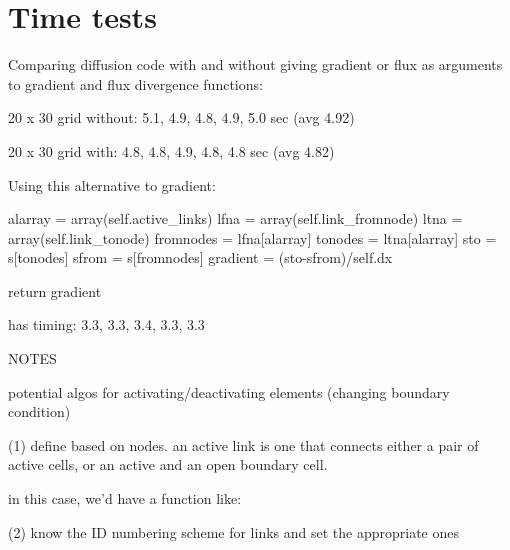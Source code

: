 \documentclass[12pt]{amsart}
\begin{document}
\section{Time tests}

Comparing diffusion code with and without giving gradient or flux as arguments to gradient and flux divergence functions:

20 x 30 grid without: 5.1, 4.9, 4.8, 4.9, 5.0 sec (avg 4.92)

20 x 30 grid with: 4.8, 4.8, 4.9, 4.8, 4.8 sec (avg 4.82)

Using this alternative to gradient:

        alarray = array(self.active_links)
        lfna = array(self.link_fromnode)
        ltna = array(self.link_tonode)
        fromnodes = lfna[alarray]
        tonodes = ltna[alarray]
        sto = s[tonodes]
        sfrom = s[fromnodes]
        gradient = (sto-sfrom)/self.dx
        
        return gradient

has timing: 3.3, 3.3, 3.4, 3.3, 3.3

NOTES

potential algos for activating/deactivating elements (changing boundary condition)

(1) define based on nodes. an active link is one that connects either a pair of active cells, or an active and an open boundary cell.

in this case, we'd have a function like:

%	
			
(2) know the ID numbering scheme for links and set the appropriate ones

	
			
\end{document}
